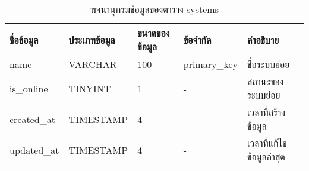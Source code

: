 \begin{table}[H]
    \caption{พจนานุกรมข้อมูลของตาราง systems}
    \label{tab:database-systems}
    \begin{tabularx}{\textwidth}{ | p{2.25cm} | p{2.20cm} | p{2.45cm} | p{2.15cm} | X | }
    \hline
    \textbf{ชื่อข้อมูล} & \textbf{ประเภทข้อมูล} & \textbf{ขนาดของข้อมูล} & \textbf{ข้อจำกัด} & \textbf{คำอธิบาย} \\
    \hline
    name & VARCHAR & 100 & primary\_key & ชื่อระบบย่อย \\
    \hline
    is\_online & TINYINT & 1 & - & สถานะของระบบย่อย \\
    \hline
    created\_at & TIMESTAMP & 4 & - & เวลาที่สร้างข้อมูล \\
    \hline
    updated\_at & TIMESTAMP & 4 & - & เวลาที่แก้ไขข้อมูลล่าสุด \\
    \hline
    \end{tabularx}
\end{table}
